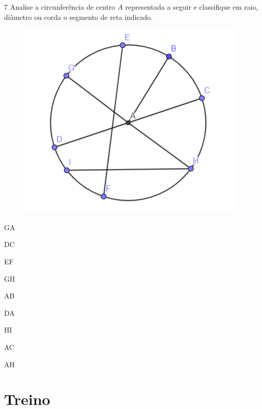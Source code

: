 \num{7} Analise a circunferência de centro $A$ representada a seguir e
classifique em raio, diâmetro ou corda o segmento de reta indicado.

\begin{figure}[H]
\centering\includegraphics[width=.75\textwidth]{./imgSAEB_8_MAT/media/image12.png}
\end{figure}

\pagebreak

\begin{escolha}
\item GA

\item DC

\item EF

\item GH

\item AB

\item DA

\item HI

\item AC

\item AH

\end{escolha}


\section*{Treino}

